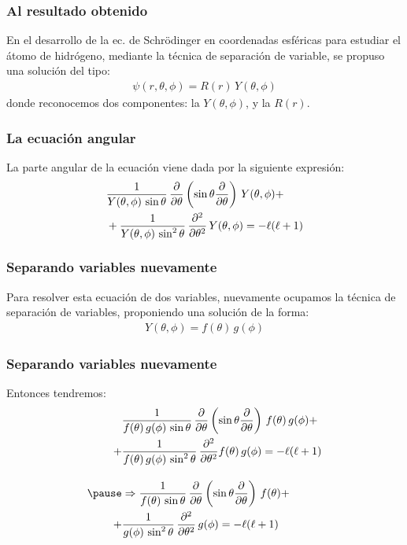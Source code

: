 \documentclass[12pt]{beamer}
\begin{document}
\begin{frame}
\frametitle{Al resultado obtenido}
En el desarrollo de la ec. de Schrödinger en coordenadas esféricas para estudiar el átomo de hidrógeno, mediante la técnica de separación de variable, se propuso una solución del tipo:
\pause
\begin{align*}
\psi (r, \theta, \phi) = R (r) \, Y(\theta, \phi)
\end{align*}
\pause
donde reconocemos dos componentes: \pause la  $Y(\theta, \phi)$, \pause y la  $R (r)$.
\end{frame}
\begin{frame}
\frametitle{La ecuación angular}
La parte angular de la ecuación viene dada por la siguiente expresión:
\pause
\begin{align}
\begin{aligned}
&\dfrac{1}{Y(\theta, \phi) \, \sin \theta} \, \pdv{\theta} \left( \sin \theta \pdv{\theta} \right) \, Y(\theta, \phi) + \\
&+ \dfrac{1}{Y(\theta, \phi) \, \sin^{2} \theta} \, \pdv[2]{\theta} \, Y(\theta, \phi) = - \ell (\ell + 1)
\end{aligned}
\label{eq:ecuacion_10_07}
\end{align}
\end{frame}
\begin{frame}
\frametitle{Separando variables nuevamente}
Para resolver esta ecuación de dos variables, nuevamente ocupamos la técnica de separación de variables, proponiendo una solución de la forma:
\pause
\begin{align*}
Y(\theta, \phi) = f (\theta) \, g(\phi)
\end{align*}
\end{frame}
\begin{frame}
\frametitle{Separando variables nuevamente}
Entonces tendremos:
\pause
\begin{eqnarray*}
\begin{aligned}
&\dfrac{1}{f (\theta) \, g(\phi) \, \sin \theta} \, \pdv{\theta} \left( \sin \theta \pdv{\theta} \right) \, f (\theta) \, g(\phi) + \\
+& \dfrac{1}{f (\theta) \, g(\phi) \, \sin^{2} \theta} \, \pdv[2]{\theta} f (\theta) \, g(\phi) = - \ell (\ell + 1) \\[1em] \pause
&\Rightarrow \dfrac{1}{f (\theta) \, \sin \theta} \, \pdv{\theta} \left( \sin \theta \pdv{\theta} \right) \, f (\theta) + \\
+& \dfrac{1}{ g(\phi) \, \sin^{2} \theta} \, \pdv[2]{\theta} \, g(\phi) = - \ell (\ell + 1)
\end{aligned}
\end{eqnarray*}
\end{frame}
\end{document}
